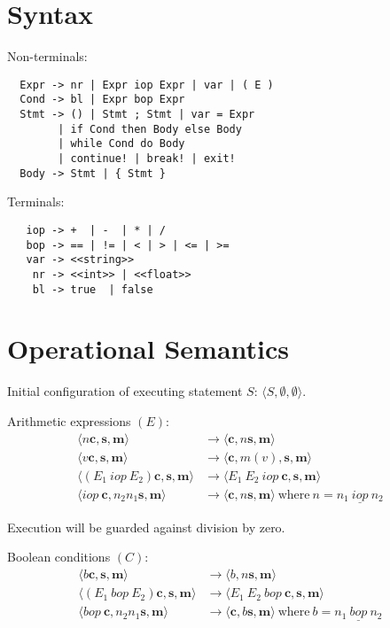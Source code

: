 \documentclass[11pt]{report}
\begin{document}
\thispagestyle{empty}
\section*{Syntax}

Non-terminals:
  \begin{lstlisting}
  Expr -> nr | Expr iop Expr | var | ( E )
  Cond -> bl | Expr bop Expr 
  Stmt -> () | Stmt ; Stmt | var = Expr
        | if Cond then Body else Body
        | while Cond do Body
        | continue! | break! | exit!
  Body -> Stmt | { Stmt }
  \end{lstlisting}

\vspace{3em}
\noindent Terminals:
    \begin{lstlisting}
   iop -> +  | -  | * | /
   bop -> == | != | < | > | <= | >=
   var -> <<string>>
    nr -> <<int>> | <<float>>
    bl -> true  | false
  \end{lstlisting}





\newpage
\section*{Operational Semantics}

Initial configuration of executing statement $S$: $ \langle S, \emptyset, \emptyset \rangle $.

\vspace{2em}
\noindent Arithmetic expressions $(E)$:
\begin{align*}
\langle n  \bm{c},  \bm{s},  \bm{m} \rangle  &\rightarrow   \langle  \bm{c}, n  \bm{s},  \bm{m} \rangle \\
\langle v  \bm{c},  \bm{s},  \bm{m} \rangle    &\rightarrow   \langle  \bm{c},  m(v),  \bm{s},  \bm{m} \rangle \\
\langle (E_1\ iop \ E_2)  \bm{c},  \bm{s},  \bm{m} \rangle    &\rightarrow   \langle E_1\  E_2\  iop  \ \bm{c},  \bm{s},  \bm{m} \rangle \\
\langle iop \ \bm{c}, n_2 n_1  \bm{s},  \bm{m} \rangle    &\rightarrow   \langle  \bm{c}, n  \bm{s},  \bm{m} \rangle  \ \text{where} \ n = n_1\ \underline{iop} \ n_2
\end{align*}

Execution will be guarded against division by zero.




\vspace{2em}
\noindent Boolean conditions $(C)$:
\begin{align*}
\langle b  \bm{c},  \bm{s},  \bm{m} \rangle    &\rightarrow   \langle b, n  \bm{s},  \bm{m} \rangle \\
\langle (E_1 \ bop \ E_2)  \bm{c},  \bm{s},  \bm{m} \rangle    &\rightarrow   \langle E_1\ E_2\ bop \ \bm{c},  \bm{s},  \bm{m} \rangle \\
\langle bop \  \bm{c}, n_2 n_1  \bm{s},  \bm{m} \rangle    &\rightarrow   \langle  \bm{c}, b  \bm{s},  \bm{m} \rangle \  \text{where} \ b = n_1\ \underline{bop}\ n_2
\end{align*}
\end{document}
